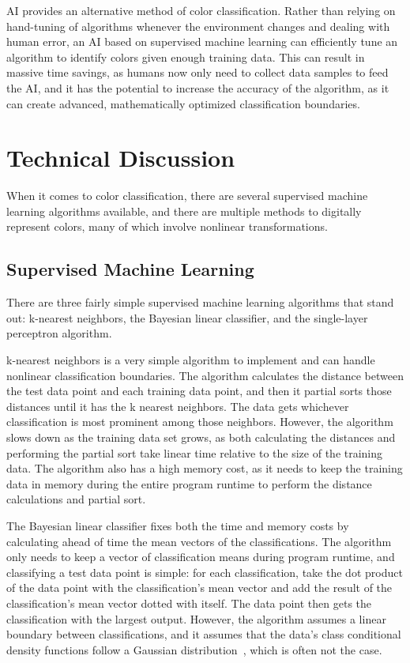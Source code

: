 \documentclass[twoside]{IEEEtran}
\begin{document}
AI provides an alternative method of color classification. Rather than relying on hand-tuning of
algorithms whenever the environment changes and dealing with human error, an AI based on
supervised machine learning can efficiently tune an algorithm to identify colors given enough
training data. This can result in massive time savings, as humans now only need to collect data
samples to feed the AI, and it has the potential to increase the accuracy of the algorithm, as it can
create advanced, mathematically optimized classification boundaries.

\section{Technical Discussion}

When it comes to color classification, there are several supervised machine learning algorithms
available, and there are multiple methods to digitally represent colors, many of which involve nonlinear
transformations.

\subsection{Supervised Machine Learning}

There are three fairly simple supervised machine learning algorithms that stand out:
k-nearest neighbors, the Bayesian linear classifier, and the single-layer perceptron algorithm.

k-nearest neighbors is a very simple algorithm to implement and can handle nonlinear
classification boundaries. The algorithm calculates the distance between the test data point and
each training data point, and then it partial sorts those distances until it has the k nearest
neighbors. The data gets whichever classification is most prominent among those neighbors.
However, the algorithm slows down as the training data set grows, as both calculating the
distances and performing the partial sort take linear time relative to the size of the training data.
The algorithm also has a high memory cost, as it needs to keep the training data in memory
during the entire program runtime to perform the distance calculations and partial sort.

The Bayesian linear classifier fixes both the time and memory costs by calculating ahead of time the
mean vectors of the classifications. The algorithm only needs to keep a vector of classification means
during program runtime, and classifying a test data point is simple: for each classification, take
the dot product of the data point with the classification's mean vector and add the result of the
classification's mean vector dotted with itself. The data point then gets the classification with the
largest output. However, the algorithm assumes a linear boundary between classifications, and it assumes
that the data's class conditional density functions follow a Gaussian distribution~\cite{farmer}, which
is often not the case.
\end{document}
